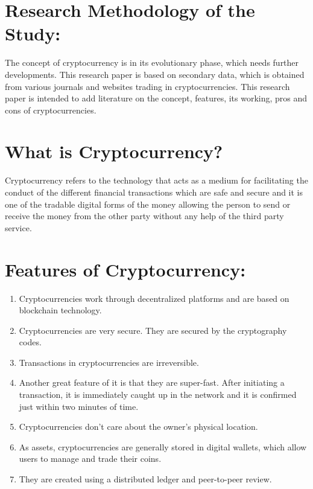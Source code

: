 \documentclass[11pt]{article}
\begin{document}
\section*{Research Methodology of the Study:}
The concept of cryptocurrency is in its evolutionary phase, which needs further developments. This research paper is based on secondary data, which is obtained from various journals and websites trading in cryptocurrencies. This research paper is intended to add literature on the concept, features, its working, pros and cons of cryptocurrencies.

\section*{What is Cryptocurrency?}
\indent Cryptocurrency refers to the technology that acts as a medium for facilitating the conduct of the different financial transactions which are safe and secure and it is one of the tradable digital forms of the money allowing the person to send or receive the money from the other party without any help of the third party service.

\section*{Features of Cryptocurrency:}
\begin{enumerate}
    \item Cryptocurrencies work through decentralized platforms and are based on blockchain technology.
    \item Cryptocurrencies are very secure. They are secured by the cryptography codes.
    \item Transactions in cryptocurrencies are irreversible.
    \item Another great feature of it is that they are super-fast. After initiating a transaction, it is immediately caught up in the network and it is confirmed just within two minutes of time.
    \item Cryptocurrencies don’t care about the owner’s physical location.
    \item As assets, cryptocurrencies are generally stored in digital wallets, which allow users to manage and trade their coins.
    \item They are created using a distributed ledger and peer-to-peer review.
\end{enumerate}
\end{document}
